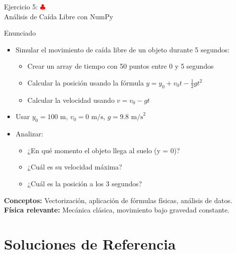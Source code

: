 \documentclass[10pt]{beamer}
\begin{document}
\begin{frame}{Ejercicio 5: \hfill \textcolor{red}{$\clubsuit$} \\ Análisis de Caída Libre con NumPy}
  \begin{block}{Enunciado}
    \begin{itemize}
      \item Simular el movimiento de caída libre de un objeto durante 5 segundos:
        \begin{itemize}
          \item Crear un array de tiempo con 50 puntos entre 0 y 5 segundos
          \item Calcular la posición usando la fórmula \(y = y_0 + v_0t - \frac{1}{2}gt^2\)
          \item Calcular la velocidad usando \(v = v_0 - gt\)
        \end{itemize}
      \item Usar \(y_0 = 100\text{ m}\), \(v_0 = 0\text{ m/s}\), \(g = 9.8\text{ m/s}^2\)
      \item Analizar:
        \begin{itemize}
          \item ¿En qué momento el objeto llega al suelo (y = 0)?
          \item ¿Cuál es su velocidad máxima?
          \item ¿Cuál es la posición a los 3 segundos?
        \end{itemize}
    \end{itemize}
  \end{block}
  
  \textbf{Conceptos:} Vectorización, aplicación de fórmulas físicas, análisis de datos.\\
  \textbf{Física relevante:} Mecánica clásica, movimiento bajo gravedad constante.
\end{frame}



\section{Soluciones de Referencia}
\end{document}
